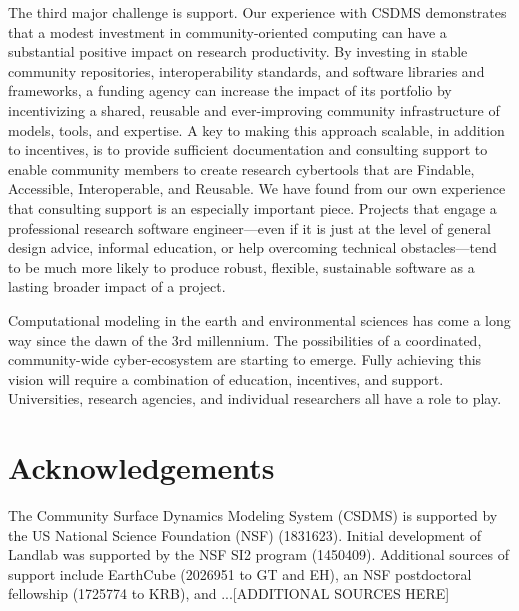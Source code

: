 \documentclass[12pt]{amsart}
\begin{document}
The third major challenge is support. Our experience with CSDMS demonstrates that a modest investment in community-oriented computing can have a substantial positive impact on research productivity. By investing in stable community repositories, interoperability standards, and software libraries and frameworks, a funding agency can increase the impact of its portfolio by incentivizing a shared, reusable and ever-improving community infrastructure of models, tools, and expertise. A key to making this approach scalable, in addition to incentives, is to provide sufficient documentation and consulting support to enable community members to create research cybertools that are Findable, Accessible, Interoperable, and Reusable. We have found from our own experience that consulting support is an especially important piece. Projects that engage a professional research software engineer---even if it is just at the level of general design advice, informal education, or help overcoming technical obstacles---tend to be much more likely to produce robust, flexible, sustainable software as a lasting broader impact of a project.

Computational modeling in the earth and environmental sciences has come a long way since the dawn of the 3rd millennium. The possibilities of a coordinated, community-wide cyber-ecosystem are starting to emerge. Fully achieving this vision will require a combination of education, incentives, and support. Universities, research agencies, and individual researchers all have a role to play.


\section{Acknowledgements}

The Community Surface Dynamics Modeling System (CSDMS) is supported by the US National Science Foundation (NSF) (1831623). Initial development of Landlab was supported by the NSF SI2 program (1450409). Additional sources of support include EarthCube (2026951 to GT and EH), an NSF postdoctoral fellowship (1725774 to KRB), and  ...[ADDITIONAL SOURCES HERE]




\end{document}
